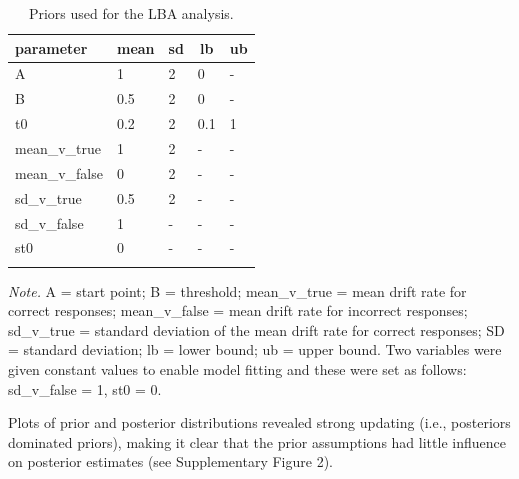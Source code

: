\documentclass[
  man,floatsintext]{apa6}
\begin{document}
\begin{table}[tbp]

\begin{center}
\begin{threeparttable}

\caption{\label{tab:prior-lba-table}Priors used for the LBA analysis.}

\begin{tabular}{lllll}
\toprule
parameter & \multicolumn{1}{c}{mean} & \multicolumn{1}{c}{sd} & \multicolumn{1}{c}{lb} & \multicolumn{1}{c}{ub}\\
\midrule
A & 1 & 2 & 0 & -\\
B & 0.5 & 2 & 0 & -\\
t0 & 0.2 & 2 & 0.1 & 1\\
mean\_v\_true & 1 & 2 & - & -\\
mean\_v\_false & 0 & 2 & - & -\\
sd\_v\_true & 0.5 & 2 & - & -\\
sd\_v\_false & 1 & - & - & -\\
st0 & 0 & - & - & -\\
\bottomrule
\addlinespace
\end{tabular}

\begin{tablenotes}[para]
\normalsize{\textit{Note.} A = start point; B = threshold; mean\_v\_true = mean drift rate for correct responses; mean\_v\_false = mean drift rate for incorrect responses; sd\_v\_true = standard deviation of the mean drift rate for correct responses; SD = standard deviation; lb = lower bound; ub = upper bound. Two variables were given constant values to enable model fitting and these were set as follows: sd\_v\_false = 1, st0 = 0.}
\end{tablenotes}

\end{threeparttable}
\end{center}

\end{table}

\newpage

Plots of prior and posterior distributions revealed strong updating (i.e., posteriors dominated priors), making it clear that the prior assumptions had little influence on posterior estimates (see Supplementary Figure 2).
\end{document}
